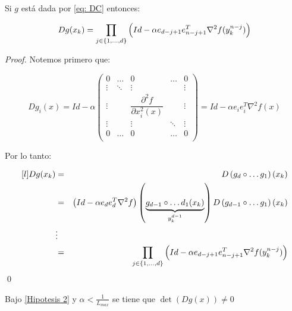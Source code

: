 \begin{lemma}
	Si $g$ est\'a dada por \ref{eq: DC} entonces:
	
	\begin{equation}
		\label{eq: Diferencial de DC}
		Dg(x_{k}) = \prod\limits_{j \in \left\lbrace1, \dots, d\right\rbrace}{\left(Id - \alpha e_{d-j+1}e_{n-j+1}^{T}\nabla ^2 f(y_{k}^{n-j})\right)}
	\end{equation}
	
\end{lemma}

\begin{proof}
	Notemos primero que:
	
	\begin{equation*}
		Dg_{i}(x) = Id - \alpha \left(
			\begin{matrix}
				0 & \dots & 0 & \dots & 0 \\
				\vdots & \ddots & \vdots &  & \vdots \\
				\vdots &  & \dfrac{\partial^2 f}{\partial x_{i}^{2} (x)} &  & \vdots \\
				\vdots &  & \vdots & \ddots & \vdots \\
				0 & \dots & 0 & \dots & 0 \\
			\end{matrix}
		\right) = Id - \alpha e_{i}e_{i}^{T} \nabla ^2 f(x)
	\end{equation*}
	
	Por lo tanto:
	
	\begin{equation*}
	\begin{aligned}[l]
	Dg(x_k) & = & D\parenthesis{g_d \circ \dots g_1}(x_k) \\
	& = & \parenthesis{Id - \alpha e_{d}e_{d}^{T}\nabla^2f}\parenthesis{\underbrace{g_{d-1} \circ \dots d_1(x_k)}_{y_{k}^{d-1}}} D\parenthesis{g_{d-1} \circ \dots g_1}(x_k) \\
	& \vdots & \\
	& = & \Bigprod{j \in \sett{1, \dots, d}}{\parenthesis{Id - \alpha e_{d-j+1}e_{n-j+1}^{T}\nabla ^2 f(y_{k}^{n-j})}}
	\end{aligned}
	\end{equation*}\qed
	
\end{proof}

\begin{proposition}
	\label{prop: DC es difeo local}
	Bajo \ref{Hipotesis 2} y $\alpha < \frac{1}{L_{max}}$ se tiene que $\det(Dg(x)) \neq 0$
\end{proposition}

